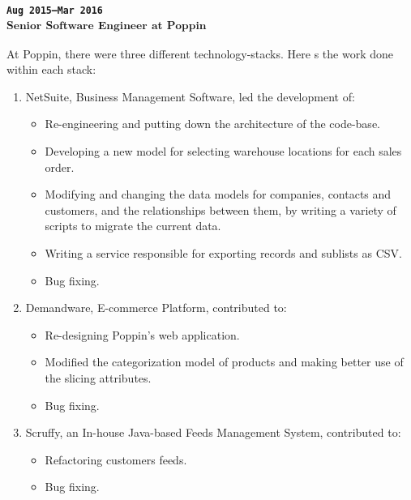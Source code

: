 \subsubsection{\textsubscript{\uppercase{\texttt{Aug 2015--Mar 2016}}\\
Senior Software Engineer at Poppin}}
At Poppin, there were three different technology-stacks. Here
s the work done within each stack:
\begin {enumerate}
\item NetSuite, Business Management Software, led the development of:
\begin {itemize}
\item Re-engineering and putting down the architecture of the code-base.
\item Developing a new model for selecting warehouse locations for each sales order.
\item Modifying and changing the data models for companies, contacts and customers, and the relationships between
them, by writing a variety of scripts to migrate the current data.
\item Writing a service responsible for exporting records and sublists as CSV.
\item Bug fixing.
\end {itemize}
\item Demandware, E-commerce Platform, contributed to:
\begin {itemize}
\item Re-designing Poppin's web application.
\item Modified the categorization model of products and making better use of the slicing attributes.
\item Bug fixing.
\end {itemize}
\item Scruffy, an In-house Java-based Feeds Management System, contributed to:
\begin {itemize}
\item Refactoring customers feeds.
\item Bug fixing.
\end {itemize}
\end {enumerate}
